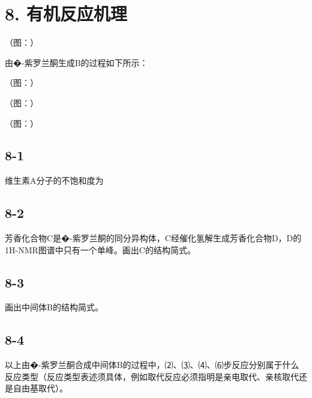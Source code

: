 \section*{8. 有机反应机理}
（图：）

由�-紫罗兰酮⽣成B的过程如下所⽰：

（图：）

（图：）

（图：）

\subsection*{8-1}
维⽣素A分⼦的不饱和度为

\subsection*{8-2}
芳⾹化合物C是�-紫罗兰酮的同分异构体，C经催化氢解⽣成芳⾹化合物D，D的1H-NMR图谱中只有⼀个单峰。画出C的结构简式。

\subsection*{8-3}
画出中间体B的结构简式。

\subsection*{8-4}
以上由�-紫罗兰酮合成中间体B的过程中，⑵、⑶、⑷、⑹步反应分别属于什么反应类型（反应类型表述须具体，例如取代反应必须指明是亲电取代、亲核取代还是⾃由基取代）。
